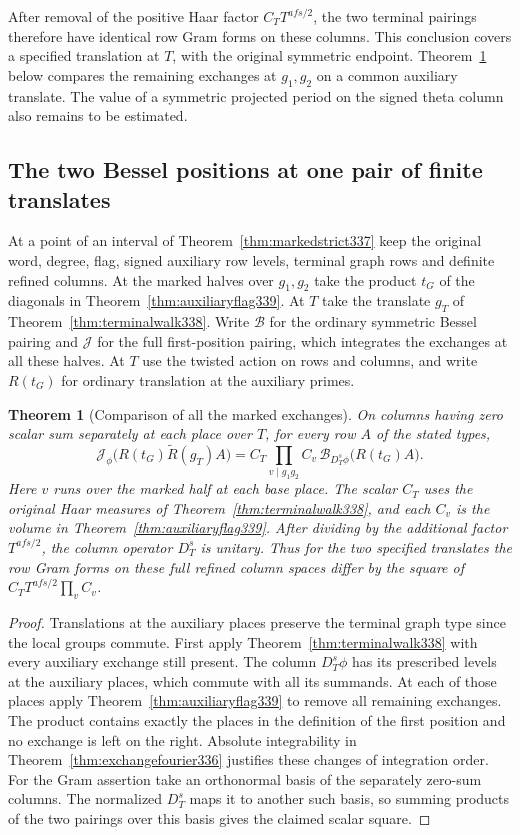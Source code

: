 \documentclass[a4paper,11pt]{article}
\newtheorem{theorem}[proposition]{Theorem}
\theoremstyle{definition}
\theoremstyle{remark}
\numberwithin{equation}{section}
\begin{document}
After removal of the positive Haar factor \(C_T T^{afs/2}\), the
two terminal pairings therefore have identical row Gram forms on
these columns. This conclusion covers a specified translation
at \(T\), with the original symmetric endpoint. Theorem~\ref{thm:markedglobal339} below compares the remaining
exchanges at \(g_1,g_2\) on a common auxiliary translate. The value of a
symmetric projected period on the signed theta column also remains
to be estimated.


\subsection{The two Bessel positions at one pair of finite translates}\label{sec:markedglobal339}
At a point of an interval of Theorem~\ref{thm:markedstrict337}
keep the original word, degree, flag, signed auxiliary row
levels, terminal graph rows and definite refined columns.
At the marked halves over \(g_1,g_2\) take the product \(t_G\)
of the diagonals in Theorem~\ref{thm:auxiliaryflag339}.
At \(T\) take the translate \(g_T\) of
Theorem~\ref{thm:terminalwalk338}. Write \(\mathcal B\) for the
ordinary symmetric Bessel pairing and \(\mathcal J\) for the
full first-position pairing, which integrates the exchanges at
all these halves. At \(T\) use the twisted action on rows and
columns, and write \(R(t_G)\) for ordinary translation at the
auxiliary primes.

\begin{theorem}[Comparison of all the marked exchanges]\label{thm:markedglobal339}
On columns having zero scalar sum separately at each place
over \(T\), for every row \(A\) of the stated types,
\[
 \mathcal J_\phi\big(R(t_G)\widetilde R(g_T)A\big)
     = C_T\!\prod_{v\mid g_1g_2} C_v\,
                        \mathcal B_{D_T^s\phi}\big(R(t_G)A\big).
\]
Here \(v\) runs over the marked half at each base place.
The scalar \(C_T\) uses the original Haar measures of
Theorem~\ref{thm:terminalwalk338}, and each \(C_v\) is the
volume in Theorem~\ref{thm:auxiliaryflag339}. After dividing
by the additional factor \(T^{afs/2}\), the column operator
\(D_T^s\) is unitary. Thus for the two specified translates
the row Gram forms on these full refined column spaces differ
by the square of \(C_T T^{afs/2}\prod_v C_v\).
\end{theorem}
\begin{proof}
Translations at the auxiliary places preserve the terminal graph
type since the local groups commute. First apply
Theorem~\ref{thm:terminalwalk338} with every auxiliary exchange
still present. The column \(D_T^s\phi\) has its prescribed levels
at the auxiliary places, which commute with all its summands.
At each of those places apply Theorem~\ref{thm:auxiliaryflag339}
to remove all remaining exchanges. The product contains exactly
the places in the definition of the first position and no exchange
is left on the right. Absolute integrability in
Theorem~\ref{thm:exchangefourier336} justifies these changes of
integration order. For the Gram assertion take an orthonormal
basis of the separately zero-sum columns. The normalized \(D_T^s\)
maps it to another such basis, so summing products of the two
pairings over this basis gives the claimed scalar square.
\end{proof}
\end{document}
